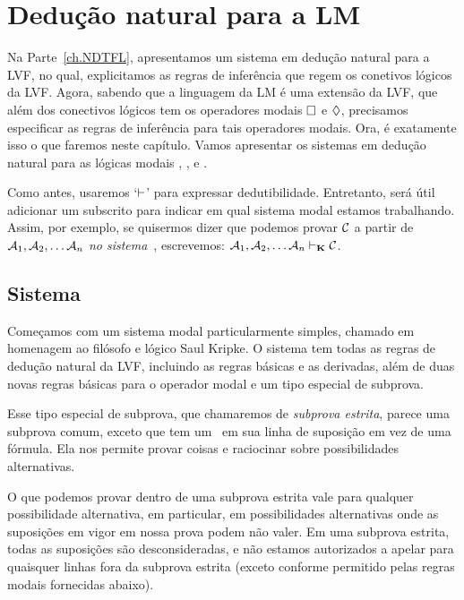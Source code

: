 \chapter{Dedução natural para a LM}
\label{Proof}

Na Parte~\ref{ch.NDTFL},  apresentamos um sistema em dedução natural para a LVF, no qual, explicitamos as regras de inferência que regem os conetivos lógicos da  LVF.  Agora, sabendo que a linguagem da LM é uma extensão da LVF,  que além dos conectivos lógicos tem os operadores modais   $\Box$ e $\Diamond$,  precisamos especificar as regras de inferência para tais operadores modais. Ora, é exatamente isso o que faremos neste capítulo. Vamos apresentar os sistemas em dedução  natural  para as lógicas modais  \mlK, \mlT, \mlSfour{} e \mlSfive.

Como  antes,  usaremos `$\vdash$' para expressar dedutibilidade. Entretanto, será útil adicionar um subscrito para indicar em qual sistema modal estamos trabalhando. Assim,  por exemplo, se quisermos dizer que podemos provar $\mathcal{C}$ a partir de $\mathcal{A}_1,\mathcal{A}_2, \dots \mathcal{A}_n$ \emph{no sistema}~\mlK, escrevemos: $\mathcal{A}_1,\mathcal{A}_2, \dots \mathcal{A}_n \vdash_{\mathbf{K}} \mathcal{C}$.

\section{Sistema \mlK}
\label{K}

Começamos com um sistema modal particularmente simples, chamado \mlK{} em homenagem ao filósofo e lógico Saul Kripke. O sistema \mlK{} tem todas as regras de dedução natural da  LVF, incluindo as regras  básicas e as derivadas, além de  duas novas regras básicas para o operador modal   \ebox{}  e um tipo especial de subprova.   

Esse  tipo especial de subprova, que chamaremos de  \emph{subprova estrita}, parece uma subprova comum, exceto que tem um~\ebox{} em sua linha de suposição em vez de uma fórmula. Ela nos permite provar coisas e raciocinar sobre possibilidades alternativas. 
 
 O que podemos provar dentro de uma subprova estrita vale para qualquer possibilidade alternativa, em particular, em possibilidades alternativas onde as suposições em vigor em nossa prova podem não valer. Em uma subprova estrita, todas as suposições são desconsideradas, e não estamos autorizados a apelar para quaisquer linhas fora da subprova estrita (exceto conforme permitido pelas regras modais fornecidas abaixo).

